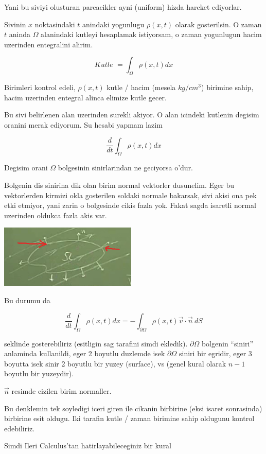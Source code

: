 \documentclass[12pt,fleqn]{article}
\begin{document}
Yani bu siviyi olusturan parcacikler ayni (uniform) hizda hareket
ediyorlar. 

Sivinin $x$ noktasindaki $t$ anindaki yogunlugu $\rho(x,t)$ olarak
gosterilsin. O zaman $t$ aninda $\Omega$ alanindaki kutleyi hesaplamak
istiyorsam, o zaman yogunlugun hacim uzerinden entegralini alirim. 

\[ \textit{Kutle } = \int_\Omega \rho(x,t) dx \]

Birimleri kontrol edeli, $\rho(x,t)$ kutle / hacim (mesela $kg / cm^3$)
birimine sahip, hacim uzerinden entegral alinca elimize kutle gecer. 

Bu sivi belirlenen alan uzerinden surekli akiyor. O alan icindeki kutlenin
degisim oranini merak ediyorum. Su hesabi yapmam lazim

\[ \frac{d}{dt} \int_\Omega \rho(x,t) dx   \]


Degisim orani $\Omega$ bolgesinin sinirlarindan ne geciyorsa o'dur. 

Bolgenin dis sinirina dik olan birim normal vektorler dusunelim. Eger bu
vektorlerden kirmizi okla gosterilen soldaki normale bakarsak, sivi akisi
ona pek etki etmiyor, yani zarin o bolgesinde cikis fazla yok. Fakat sagda
isaretli normal uzerinden oldukca fazla akis var.

\includegraphics[height=3cm]{1_2.png}

Bu durumu da

\[ \frac{d}{dt} \int_\Omega \rho(x,t) dx   = 
- \int_{\partial \Omega} \rho(x,t) \vec{v} \cdot \vec{n} \ dS 
\]

seklinde gosterebiliriz (esitligin sag tarafini simdi ekledik). $\partial
\Omega$ bolgenin 
``siniri'' anlaminda kullanildi, eger 2 boyutlu duzlemde isek
$\partial \Omega$ siniri bir egridir, eger 3 boyutta isek sinir 2 boyutlu bir
yuzey (surface), vs (genel kural olarak $n-1$ boyutlu bir yuzeydir).

$\vec{n}$ resimde cizilen birim normaller. 

Bu denklemin tek soyledigi iceri giren ile cikanin birbirine (eksi isaret
sonrasinda) birbirine esit oldugu. Iki tarafin kutle / zaman birimine sahip
oldugunu kontrol edebiliriz. 

Simdi Ileri Calculus'tan hatirlayabileceginiz bir kural 
\end{document}
